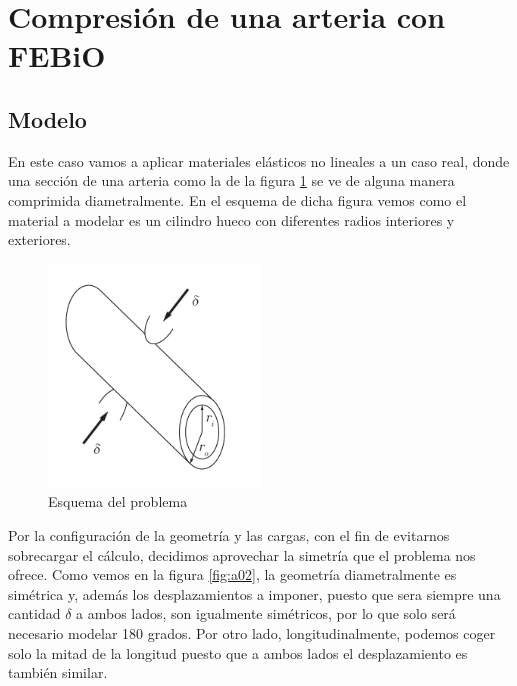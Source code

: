 \clearpage
\section{Compresión de una arteria con FEBiO}
\label{sec:arteria}

\subsection{Modelo}

En este caso vamos a aplicar materiales elásticos no lineales a un caso real, donde una sección de una arteria como la de la figura \ref{fig:a01} se ve de alguna manera comprimida diametralmente. En el esquema de dicha figura vemos como el material a modelar es un cilindro hueco con diferentes radios interiores y exteriores.

\begin{figure}[!htp]
\centering
\includegraphics[width=0.5\textwidth]{figuras_3/esquema_arteria.pdf}
\caption{Esquema del problema}
\label{fig:a01}
\end{figure}

Por la configuración de la geometría y las cargas, con el fin de evitarnos sobrecargar el cálculo, decidimos aprovechar la simetría que el problema nos ofrece. Como vemos en la figura \ref{fig:a02}, la geometría diametralmente es simétrica y, además los desplazamientos a imponer, puesto que sera siempre una cantidad $\delta$ a ambos lados, son igualmente simétricos, por lo que solo será necesario modelar 180 grados. Por otro lado, longitudinalmente, podemos coger solo la mitad de la longitud puesto que a ambos lados el desplazamiento es también similar.

